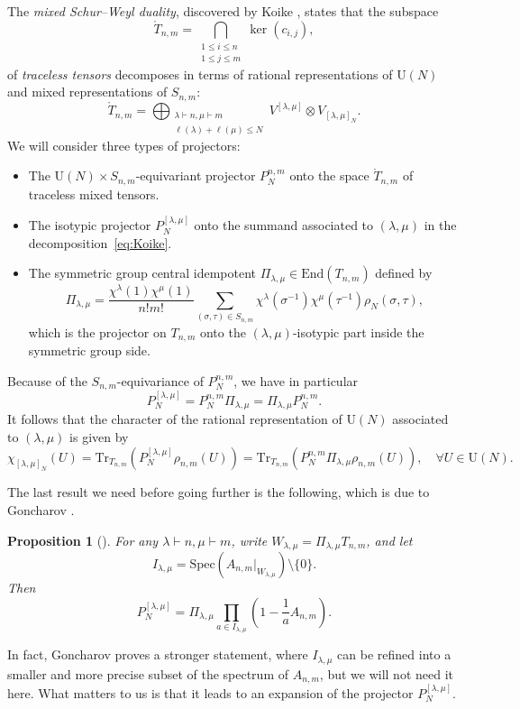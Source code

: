 \documentclass[11pt,a4paper,reqno]{article}
\newtheorem{proposition}[theorem]{Proposition}
\theoremstyle{definition}
\theoremstyle{remark}
\newcommand\U{{\mathrm U}}
\newcommand\Tr{\mathrm{Tr}}
\newcommand\End{{\mathrm{End}}}
\newcommand\TT{{\mathring{T}}}
\newcommand\Spec{{\mathrm{Spec}}}
\begin{document}
The \emph{mixed Schur--Weyl duality}, discovered by Koike \cite{Koi89}, states that the subspace
\[
\TT_{n,m}=\bigcap_{\substack{1\leq i\leq n\\ 1\leq j\leq m}}\ker(c_{i,j}),
\]
of \emph{traceless tensors} decomposes in terms of rational representations of $\U(N)$ and mixed representations of $S_{n,m}$:
\begin{equation}\label{eq:Koike}
\TT_{n,m}=\bigoplus_{\substack{\lambda\vdash n,\mu\vdash m\\
\ell(\lambda)+\ell(\mu)\leq N}}V^{[\lambda,\mu]}\otimes V_{[\lambda,\mu]_N}.
\end{equation}
We will consider three types of projectors:
\begin{itemize}
\item The $\U(N)\times S_{n,m}$-equivariant projector $P_N^{n,m}$ onto the space $\TT_{n,m}$ of traceless mixed tensors.
\item The isotypic projector $P_N^{[\lambda,\mu]}$ onto the summand associated to $(\lambda,\mu)$ in the decomposition~\eqref{eq:Koike}.
\item The symmetric group central idempotent $\Pi_{\lambda,\mu}\in\End(T_{n,m})$ defined by
\[
\Pi_{\lambda,\mu}=\frac{\chi^\lambda(1)\chi^\mu(1)}{n!m!}\sum_{(\sigma,\tau)\in S_{n,m}}\chi^\lambda(\sigma^{-1})\chi^\mu(\tau^{-1})\rho_N(\sigma,\tau),
\]
which is the projector on $T_{n,m}$ onto the $(\lambda,\mu)$-isotypic part inside the symmetric group side.
\end{itemize}
Because of the $S_{n,m}$-equivariance of $P_N^{n,m}$, we have in particular
\begin{equation}
P_N^{[\lambda,\mu]}=P_N^{n,m}\Pi_{\lambda,\mu}=\Pi_{\lambda,\mu}P_N^{n,m}.
\end{equation}
It follows that the character of the rational representation of $\U(N)$ associated to $(\lambda,\mu)$ is given by
\begin{equation}\label{eq:Koike-character}
\chi_{[\lambda,\mu]_N}(U)=\Tr_{T_{n,m}}\left(P_N^{[\lambda,\mu]}\rho_{n,m}(U)\right)=\Tr_{T_{n,m}}\left(P_N^{n,m}\Pi_{\lambda,\mu}\rho_{n,m}(U)\right),\quad \forall U\in\U(N).
\end{equation}

The last result we need before going further is the following, which is due to Goncharov \cite{Gon25}.

\begin{proposition}[\cite{Gon25}]\label{prop:goncharov}
For any $\lambda\vdash n,\mu\vdash m$, write $W_{\lambda,\mu}=\Pi_{\lambda,\mu}T_{n,m}$, and let
\[
I_{\lambda,\mu}=\Spec(A_{n,m}\vert_{W_{\lambda,\mu}})\setminus\{0\}.
\]
Then
\begin{equation}
P_N^{[\lambda,\mu]}=\Pi_{\lambda,\mu}\prod_{a\in I_{\lambda,\mu}}\left(1-\frac1a A_{n,m}\right).
\end{equation}
\end{proposition}
In fact, Goncharov proves a stronger statement, where $I_{\lambda,\mu}$ can be refined into a smaller and more precise subset of the spectrum of $A_{n,m}$, but we will not need it here. What matters to us is that it leads to an expansion of the projector $P_N^{[\lambda,\mu]}$.
\end{document}
